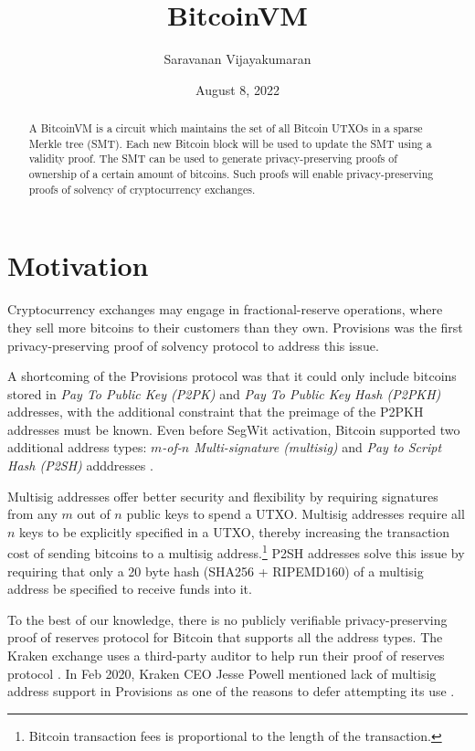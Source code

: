 \documentclass[10pt]{article}
\title{BitcoinVM}
\date{August 8, 2022}
\author{Saravanan Vijayakumaran}
\begin{document}
\maketitle
\begin{abstract}
  A BitcoinVM is a circuit which maintains the set of all Bitcoin UTXOs in a sparse Merkle tree (SMT). Each new Bitcoin block will be used to update the SMT using a validity proof. The SMT can be used to generate privacy-preserving proofs of ownership of a certain amount of bitcoins. Such proofs will enable privacy-preserving proofs of solvency of cryptocurrency exchanges.
\end{abstract}
  
\section{Motivation}%
\label{sec:motivation}
Cryptocurrency exchanges may engage in fractional-reserve operations, where they sell more bitcoins to their customers than they own. Provisions \cite{Dagher2015} was the first privacy-preserving proof of solvency protocol to address this issue.

A shortcoming of the Provisions protocol was that it could only include bitcoins stored in \textit{Pay To Public Key (P2PK)} and \textit{Pay To Public Key Hash (P2PKH)} addresses, with the additional constraint that the preimage of the P2PKH addresses must be known. Even before SegWit activation, Bitcoin supported two additional address types: \textit{$m$-of-$n$ Multi-signature (multisig)} and \textit{Pay to Script Hash (P2SH)} adddresses \cite[Section 5.5]{Vijayakumaran2017}.

Multisig addresses offer better security and flexibility by requiring signatures from any $m$ out of $n$ public keys to spend a UTXO. Multisig addresses require all $n$ keys to be explicitly specified in a UTXO, thereby increasing the transaction cost of sending bitcoins to a multisig address.\footnote{Bitcoin transaction fees is proportional to the length of the transaction.} P2SH addresses solve this issue by requiring that only a 20 byte hash (SHA256 + RIPEMD160) of a multisig address be specified to receive funds into it.

To the best of our knowledge, there is no publicly verifiable privacy-preserving proof of reserves protocol for Bitcoin that supports all the address types. The Kraken exchange uses a third-party auditor to help run their proof of reserves protocol \cite{KrakenPoR}. In Feb 2020, Kraken CEO Jesse Powell mentioned lack of multisig address support in Provisions as one of the reasons to defer attempting its use \cite{KrakenCEO}.
\end{document}
